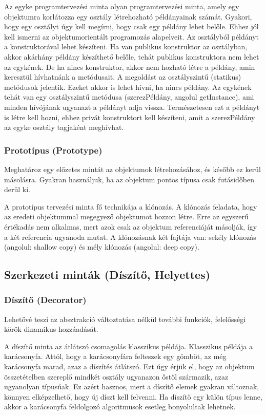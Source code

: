 \documentclass[margin=0px]{article}
\begin{document}
Az egyke programtervezési minta olyan programtervezési minta, amely egy objektumra korlátozza egy osztály létrehozható példányainak számát. Gyakori, hogy egy osztályt úgy kell megírni, hogy csak egy példány lehet belőle. Ehhez jól kell ismerni az objektumorientált programozás alapelveit. Az osztályból példányt a konstruktorával lehet készíteni. Ha van publikus konstruktor az osztályban, akkor akárhány példány készíthető belőle, tehát publikus konstruktora nem lehet az egykének. De ha nincs konstruktor, akkor nem hozható létre a példány, amin keresztül hívhatnánk a metódusait. A megoldást az osztályszintű (statikus) metódusok jelentik. Ezeket akkor is lehet hívni, ha nincs példány. Az egykének tehát van egy osztályszintű metódusa (szerezPéldány, angolul getInstance), ami minden hívójának ugyanazt a példányt adja vissza. Természetesen ezt a példányt is létre kell hozni, ehhez privát konstruktort kell készíteni, amit a szerezPéldány az egyke osztály tagjaként meghívhat.

\subsubsection{Prototípus (Prototype)}
Meghatároz egy előzetes mintát az objektumok létrehozásához, és később ez kerül másolásra. Gyakran használjuk, ha az objektum pontos típusa csak futásidőben derül ki.

A prototípus tervezési minta fő technikája a klónozás. A klónozás feladata, hogy az eredeti objektummal megegyező objektumot hozzon létre. Erre az egyszerű értékadás nem alkalmas, mert azok csak az objektum referenciáját másolják, így a két referencia ugyanoda mutat. A klónozásnak két fajtája van: sekély klónozás (angolul: shallow copy) és mély klónozás (angolul: deep copy).

\subsection{Szerkezeti minták (Díszítő, Helyettes)}

\subsubsection{Díszítő (Decorator)}
Lehetővé teszi az absztrakció változtatása nélkül további funkciók, felelősségi körök dinamikus hozzáadását.

A díszítő minta az átlátszó csomagolás klasszikus példája. Klasszikus példája a karácsonyfa. Attól, hogy a karácsonyfára felteszek egy gömböt, az még karácsonyfa marad, azaz a díszítés átlátszó. Ezt úgy érjük el, hogy az objektum összetételben szereplő mindkét osztály ugyanazon őstől származik, azaz ugyanolyan típusúak. Ez azért hasznos, mert a díszítő elemek gyakran változnak, könnyen elképzelhető, hogy új díszt kell felvenni. Ha díszítő egy külön típus lenne, akkor a karácsonyfa feldolgozó algoritmusok esetleg bonyolultak lehetnek.
\end{document}
